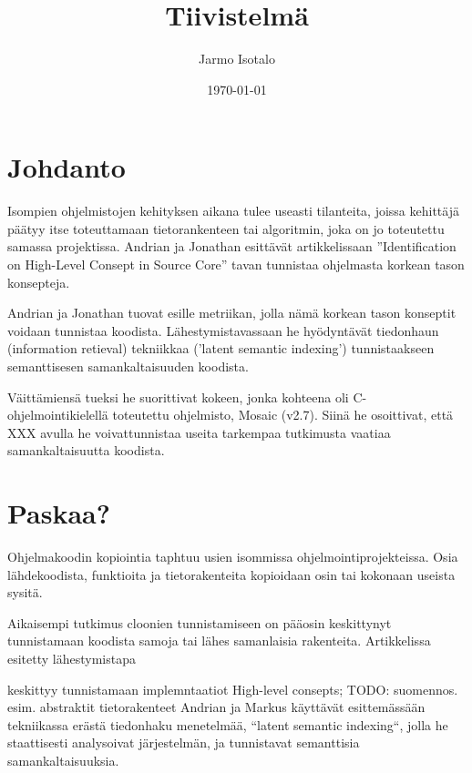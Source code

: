 \documentclass[finnish]{../tktltiki2}
\title{Tiivistelmä}
\author{Jarmo Isotalo}
\date{\today}
\theoremstyle{definition}
\theoremstyle{remark}
\begin{document}

\frontmatter      %

\maketitle        %


\mainmatter
\section{Johdanto}
Isompien ohjelmistojen kehityksen aikana tulee useasti tilanteita, joissa kehittäjä päätyy itse toteuttamaan
tietorankenteen tai algoritmin, joka on jo toteutettu samassa projektissa. Andrian ja Jonathan esittävät artikkelissaan
''Identification on High-Level Consept in Source Core''\cite{marcus2001identification}
tavan tunnistaa ohjelmasta korkean tason konsepteja.

Andrian ja Jonathan tuovat esille metriikan, jolla nämä korkean tason konseptit voidaan tunnistaa koodista.
Lähestymistavassaan he hyödyntävät tiedonhaun (information retieval) tekniikkaa ('latent semantic indexing')
tunnistaakseen semanttisesen
samankaltaisuuden koodista.

Väittämiensä tueksi he suorittivat kokeen, jonka kohteena oli C-ohjelmointikielellä toteutettu ohjelmisto,
Mosaic (v2.7). Siinä he osoittivat, että XXX avulla he voivattunnistaa useita tarkempaa tutkimusta vaatiaa
samankaltaisuutta koodista.


\section{Paskaa?}
Ohjelmakoodin kopiointia taphtuu usien isommissa ohjelmointiprojekteissa. Osia lähdekoodista, funktioita ja
tietorakenteita kopioidaan osin tai kokonaan useista sysitä.

Aikaisempi tutkimus cloonien tunnistamiseen on pääosin keskittynyt tunnistamaan koodista samoja tai lähes samanlaisia
rakenteita. Artikkelissa esitetty lähestymistapa

keskittyy tunnistamaan implemntaatiot High-level consepts; TODO: suomennos. esim. abstraktit tietorakenteet
Andrian ja Markus käyttävät esittemässään tekniikassa erästä tiedonhaku menetelmää, ``latent semantic indexing``,
jolla he staattisesti analysoivat järjestelmän, ja
tunnistavat semanttisia samankaltaisuuksia.
\end{document}
